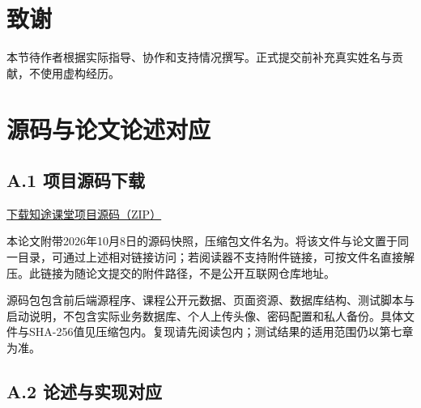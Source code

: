 \documentclass[UTF8,12pt,a4paper,oneside,openany]{ctexbook}
\begin{document}
\chapter*{致谢}

本节待作者根据实际指导、协作和支持情况撰写。正式提交前补充真实姓名与贡献，不使用虚构经历。


\appendix
\chapter{源码与论文论述对应}

\section{A.1 项目源码下载}

\href{zhitu-classroom-source.zip}{下载知途课堂项目源码（ZIP）}


本论文附带2026年10月8日的源码快照，压缩包文件名为。将该文件与论文置于同一目录，可通过上述相对链接访问；若阅读器不支持附件链接，可按文件名直接解压。此链接为随论文提交的附件路径，不是公开互联网仓库地址。


源码包包含前后端源程序、课程公开元数据、页面资源、数据库结构、测试脚本与启动说明，不包含实际业务数据库、个人上传头像、密码配置和私人备份。具体文件与SHA-256值见压缩包内。复现请先阅读包内；测试结果的适用范围仍以第七章为准。


\section{A.2 论述与实现对应}
\end{document}
